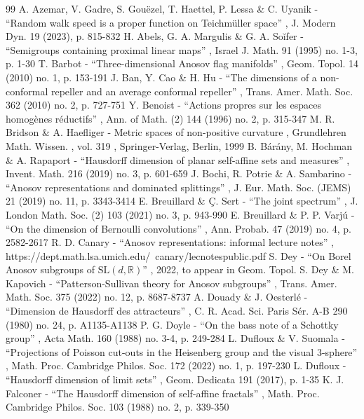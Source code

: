 \begin{thebibliography}{99}
 A. Azemar, V. Gadre, S. Gouëzel, T. Haettel, P. Lessa \& C. Uyanik - “Random walk speed is a proper function on Teichmüller space” , J. Modern Dyn. 19 (2023), p. 815-832
 H. Abels, G. A. Margulis \& G. A. Soĭfer - “Semigroups containing proximal linear maps” , Israel J. Math. 91 (1995) no. 1-3, p. 1-30
 T. Barbot - “Three-dimensional Anosov flag manifolds” , Geom. Topol. 14 (2010) no. 1, p. 153-191
 J. Ban, Y. Cao \& H. Hu - “The dimensions of a non-conformal repeller and an average conformal repeller” , Trans. Amer. Math. Soc. 362 (2010) no. 2, p. 727-751
 Y. Benoist - “Actions propres sur les espaces homogènes réductifs” , Ann. of Math. (2) 144 (1996) no. 2, p. 315-347
 M. R. Bridson \& A. Haefliger - Metric spaces of non-positive curvature , Grundlehren Math. Wissen. , vol. 319 , Springer-Verlag, Berlin, 1999
 B. Bárány, M. Hochman \& A. Rapaport - “Hausdorff dimension of planar self-affine sets and measures” , Invent. Math. 216 (2019) no. 3, p. 601-659
 J. Bochi, R. Potrie \& A. Sambarino - “Anosov representations and dominated splittings” , J. Eur. Math. Soc. (JEMS) 21 (2019) no. 11, p. 3343-3414
 E. Breuillard \& Ç. Sert - “The joint spectrum” , J. London Math. Soc. (2) 103 (2021) no. 3, p. 943-990
 E. Breuillard \& P. P. Varjú - “On the dimension of Bernoulli convolutions” , Ann. Probab. 47 (2019) no. 4, p. 2582-2617
 R. D. Canary - “Anosov representations: informal lecture notes” , https://dept.math.lsa.umich.edu/~canary/lecnotespublic.pdf
 S. Dey - “On Borel Anosov subgroups of $\mathrm{SL}(d, \mathbb{R})$” , 2022, to appear in Geom. Topol.
 S. Dey \& M. Kapovich - “Patterson-Sullivan theory for Anosov subgroups” , Trans. Amer. Math. Soc. 375 (2022) no. 12, p. 8687-8737
 A. Douady \& J. Oesterlé - “Dimension de Hausdorff des attracteurs” , C. R. Acad. Sci. Paris Sér. A-B 290 (1980) no. 24, p. A1135-A1138
 P. G. Doyle - “On the bass note of a Schottky group” , Acta Math. 160 (1988) no. 3-4, p. 249-284
 L. Dufloux \& V. Suomala - “Projections of Poisson cut-outs in the Heisenberg group and the visual 3-sphere” , Math. Proc. Cambridge Philos. Soc. 172 (2022) no. 1, p. 197-230
 L. Dufloux - “Hausdorff dimension of limit sets” , Geom. Dedicata 191 (2017), p. 1-35
 K. J. Falconer - “The Hausdorff dimension of self-affine fractals” , Math. Proc. Cambridge Philos. Soc. 103 (1988) no. 2, p. 339-350

\end{thebibliography}
